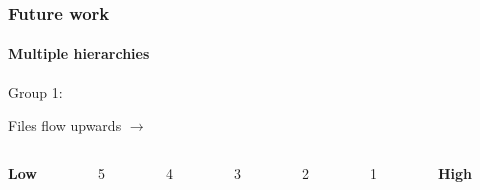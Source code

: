 \documentclass{beamer}
\begin{document}
  
  
  \begin{frame}
  	\frametitle{Future work}
  	\framesubtitle{Multiple hierarchies}
  	Group 1:
  	\vspace*{-0.3cm}
  	\begin{center}
  		Files flow upwards $\boldsymbol{\longrightarrow}$
  	\end{center}
    \vspace*{-1cm}
    \begin{columns}
    \begin{column}[T]{1cm}
     \begin{center}
      \textbf{Low} 
     \end{center} 
     \end{column}
     
     \begin{column}[T]{1cm}
     \begin{center}
      5
     \end{center} 
     \end{column}

     \begin{column}[T]{1cm}
     \begin{center}
     4
     \end{center} 
     \end{column}
     
     \begin{column}[T]{1cm}
     \begin{center}
      3
     \end{center} 
     \end{column}
     
     \begin{column}[T]{1cm}
     \begin{center}
      2
     \end{center} 
     \end{column}
     
     \begin{column}[T]{1cm}
     \begin{center}
      1
     \end{center} 
     \end{column}
     
     \begin{column}[T]{1cm}
     \begin{center}
      \textbf{High}
     \end{center} 
     \end{column}
    \end{columns}
    

\end{frame}
\end{document}
